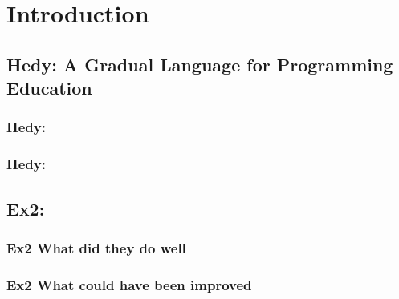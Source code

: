 \chapter{Introduction}

\section{Hedy: A Gradual Language for Programming Education}

\subsection{Hedy: }

\subsection{Hedy: }

\section{Ex2:} 

\subsection{Ex2 What did they do well}

\subsection{Ex2 What could have been improved}